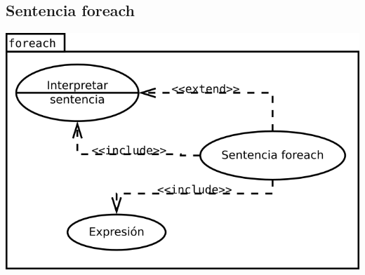 \subsection {Sentencia foreach}
\begin{center}
\includegraphics[scale=0.4]{foreach.png} \\
\end{center}
